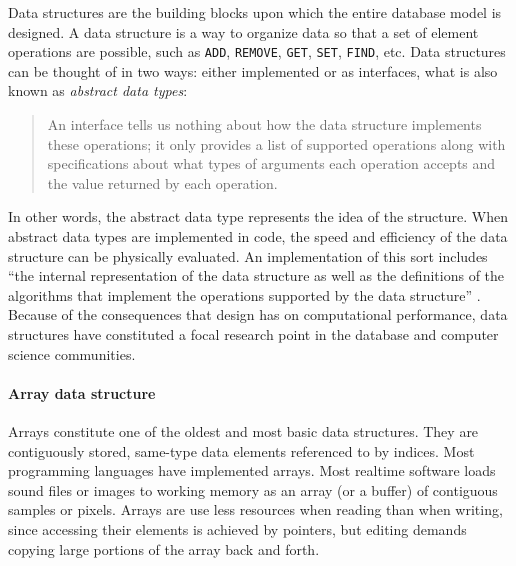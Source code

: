 Data structures are the building blocks upon which the entire database model is designed. A data structure is a way to organize data so that a set of element operations are possible, such as \texttt{ADD}, \texttt{REMOVE}, \texttt{GET}, \texttt{SET}, \texttt{FIND}, etc. Data structures can be thought of in two ways: either implemented or as interfaces, what is also known as \textit{abstract data types}:

\begin{quote}
	An interface tells us nothing about how the data structure implements these operations; it only provides a list of supported operations along with specifications about what types of arguments each operation accepts and the value returned by each operation. \parencite[18]{ods-cpp}
\end{quote}

In other words, the abstract data type represents the idea of the structure. When abstract data types are implemented in code, the speed and efficiency of the data structure can be physically evaluated. An implementation of this sort includes ``the internal representation of the data structure as well as the definitions of the algorithms that implement the operations supported by the data structure'' \parencite[18]{ods-cpp}. Because of the consequences that design has on computational performance, data structures have constituted a focal research point in the database and computer science communities.


\paragraph{Array data structure}
Arrays constitute one of the oldest and most basic data structures. They are contiguously stored, same-type data elements referenced to by indices. Most programming languages have implemented arrays. Most realtime software loads sound files or images to working memory as an array (or a buffer) of contiguous samples or pixels. Arrays are use less resources when reading than when writing, since accessing their elements is achieved by pointers, but editing demands copying large portions of the array back and forth.

